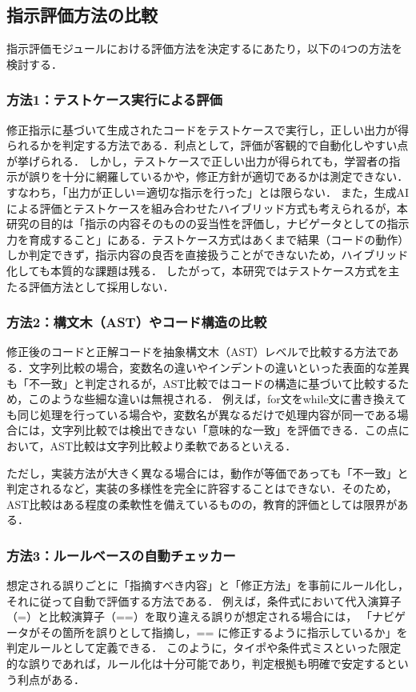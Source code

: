 \documentclass[twoside,twocolumn,10pt]{jsarticle}
\begin{document}
\subsection {指示評価方法の比較}
指示評価モジュールにおける評価方法を決定するにあたり，以下の4つの方法を検討する．

\subsubsection*{方法1：テストケース実行による評価}
修正指示に基づいて生成されたコードをテストケースで実行し，正しい出力が得られるかを判定する方法である．利点として，評価が客観的で自動化しやすい点が挙げられる．  
しかし，テストケースで正しい出力が得られても，学習者の指示が誤りを十分に網羅しているかや，修正方針が適切であるかは測定できない．すなわち，「出力が正しい＝適切な指示を行った」とは限らない．  
また，生成AIによる評価とテストケースを組み合わせたハイブリッド方式も考えられるが，本研究の目的は「指示の内容そのものの妥当性を評価し，ナビゲータとしての指示力を育成すること」にある．テストケース方式はあくまで結果（コードの動作）しか判定できず，指示内容の良否を直接扱うことができないため，ハイブリッド化しても本質的な課題は残る．  
したがって，本研究ではテストケース方式を主たる評価方法として採用しない．

\subsubsection*{方法2：構文木（AST）やコード構造の比較}
修正後のコードと正解コードを抽象構文木（AST）レベルで比較する方法である．文字列比較の場合，変数名の違いやインデントの違いといった表面的な差異も「不一致」と判定されるが，AST比較ではコードの構造に基づいて比較するため，このような些細な違いは無視される．  
例えば，for文をwhile文に書き換えても同じ処理を行っている場合や，変数名が異なるだけで処理内容が同一である場合には，文字列比較では検出できない「意味的な一致」を評価できる．この点において，AST比較は文字列比較より柔軟であるといえる．  

ただし，実装方法が大きく異なる場合には，動作が等価であっても「不一致」と判定されるなど，実装の多様性を完全に許容することはできない．そのため，AST比較はある程度の柔軟性を備えているものの，教育的評価としては限界がある．


\subsubsection*{方法3：ルールベースの自動チェッカー}
想定される誤りごとに「指摘すべき内容」と「修正方法」を事前にルール化し，それに従って自動で評価する方法である．  
例えば，条件式において代入演算子（=）と比較演算子（==）を取り違える誤りが想定される場合には，  
「ナビゲータがその箇所を誤りとして指摘し，== に修正するように指示しているか」を判定ルールとして定義できる．  
このように，タイポや条件式ミスといった限定的な誤りであれば，ルール化は十分可能であり，判定根拠も明確で安定するという利点がある．
\end{document}
